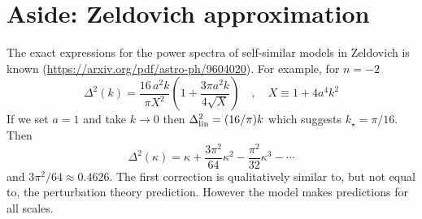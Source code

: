 \documentclass{article}
\begin{document}
\clearpage

\section{Aside: Zeldovich approximation}

The exact expressions for the power spectra of self-similar models in Zeldovich is known (\url{https://arxiv.org/pdf/astro-ph/9604020}).
For example, for $n=-2$
\begin{equation}
    \Delta^2(k) = \frac{16\,a^2 k}{\pi X^2}\left( 1 + \frac{3\pi a^2 k}{4\sqrt{X}}\right)
    \quad , \quad
    X\equiv 1 + 4 a^4 k^2
\end{equation}
If we set $a=1$ and take $k\to 0$ then $\Delta^2_{\rm lin}=(16/\pi)k$ which suggests $k_\star=\pi/16$.  Then
\begin{equation}
    \Delta^2(\kappa) = \kappa + \frac{3\pi^2}{64} \kappa^2
    - \frac{\pi^2}{32}\kappa^3 - \cdots
\end{equation}
and $3\pi^2/64\approx 0.4626$.  The first correction is qualitatively similar to, but not equal to, the perturbation theory prediction.  However the model makes predictions for all scales.
\end{document}
